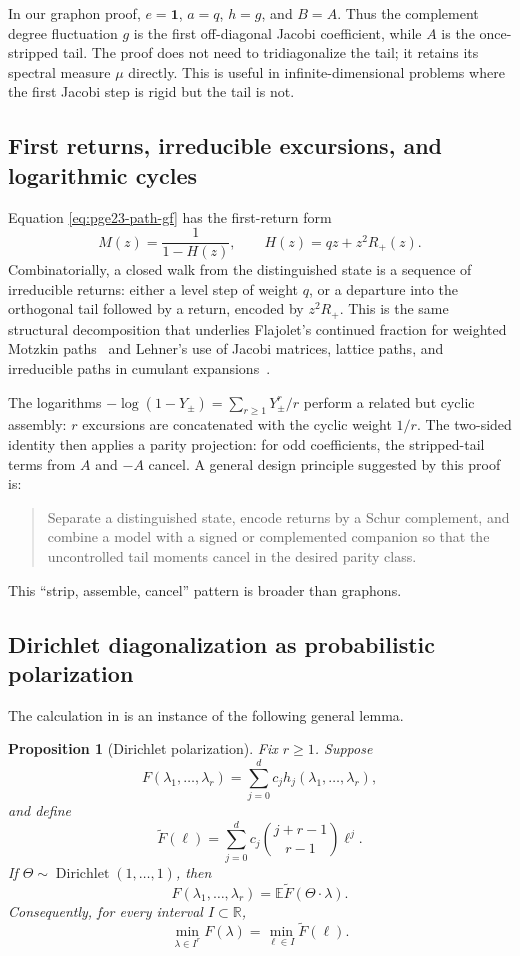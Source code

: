 \documentclass[11pt]{article}
\newtheorem{proposition}[theorem]{Proposition}
\numberwithin{equation}{section}
\newcommand{\one}{\mathbf 1}
\newcommand{\R}{\mathbb R}
\newcommand{\E}{\mathbb E}
\begin{document}
In our graphon proof, $e=\one$, $a=q$, $h=g$, and $B=A$.
Thus the complement degree fluctuation $g$ is the first off-diagonal Jacobi coefficient, while $A$ is the once-stripped tail.
The proof does not need to tridiagonalize the tail; it retains its spectral measure $\mu$ directly.
This is useful in infinite-dimensional problems where the first Jacobi step is rigid but the tail is not.

\subsection{First returns, irreducible excursions, and logarithmic cycles}

Equation \eqref{eq:pge23-path-gf} has the first-return form
\[
  M(z)=\frac{1}{1-H(z)},
  \qquad H(z)=qz+z^2R_+(z).
\]
Combinatorially, a closed walk from the distinguished state is a sequence of irreducible returns: either a level step of weight $q$, or a departure into the orthogonal tail followed by a return, encoded by $z^2R_+$.
This is the same structural decomposition that underlies Flajolet's continued fraction for weighted Motzkin paths~\cite{Flajolet1980} and Lehner's use of Jacobi matrices, lattice paths, and irreducible paths in cumulant expansions~\cite{Lehner2003}.

The logarithms $-\log(1-Y_\pm)=\sum_{r\ge1}Y_\pm^r/r$ perform a related but cyclic assembly: $r$ excursions are concatenated with the cyclic weight $1/r$.
The two-sided identity then applies a parity projection: for odd coefficients, the stripped-tail terms from $A$ and $-A$ cancel.
A general design principle suggested by this proof is:
\begin{quote}
  Separate a distinguished state, encode returns by a Schur complement, and combine a model with a signed or complemented companion so that the uncontrolled tail moments cancel in the desired parity class.
\end{quote}
This ``strip, assemble, cancel'' pattern is broader than graphons.

\subsection{Dirichlet diagonalization as probabilistic polarization}

The calculation in  is an instance of the following general lemma.

\begin{proposition}[Dirichlet polarization]\label{prop:general-dirichlet}
  Fix $r\ge1$.
  Suppose
  \[
    F(\lambda_1,\ldots,\lambda_r)
    =\sum_{j=0}^d c_jh_j(\lambda_1,\ldots,\lambda_r),
  \]
  and define
  \[
    \widetilde F(\ell)
    =\sum_{j=0}^d c_j\binom{j+r-1}{r-1}\ell^j.
  \]
  If $\Theta\sim\operatorname{Dirichlet}(1,\ldots,1)$, then
  \[
    F(\lambda_1,\ldots,\lambda_r)
    =\E\widetilde F(\Theta\cdot\lambda).
  \]
  Consequently, for every interval $I\subset\R$,
  \[
    \min_{\lambda\in I^r}F(\lambda)
    =\min_{\ell\in I}\widetilde F(\ell).
  \]
\end{proposition}
\end{document}
